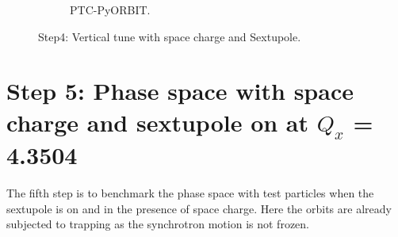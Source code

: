 \documentclass[a4paper]{cernatsnote}
\begin{document}
\begin{figure}
\begin{subfigure}{.5\textwidth}
          \caption{PTC-PyORBIT.}
          \label{fig:step4V_po}
        \end{subfigure}
        \caption{Step4: Vertical tune with space charge and Sextupole.}
        \label{fig:step4V}
\end{figure}

\section{Step 5: Phase space with space charge and sextupole on at $Q_x$ = 4.3504}

The fifth step is to benchmark the phase space with test particles when the sextupole is on and in the presence of space charge. Here the orbits are already subjected to trapping as the synchrotron motion is not frozen.
\end{document}
